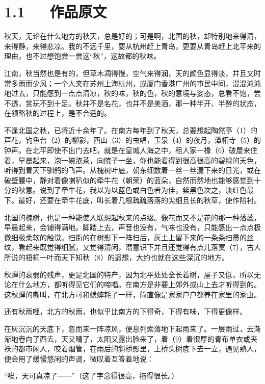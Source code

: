 \documentclass[letterpaper,12pt,english]{sphinxmanual}
\begin{document}
\section{1.1   作品原文}
\label{\detokenize{p01_u6563_u6587/_u90c1_u8fbe_u592b-_u53e4_u90fd_u7684_u79cb:id3}}
秋天，无论在什么地方的秋天，总是好的；可是啊，北国的秋，却特别地来得清，来得静，来得悲凉。我的不远千里，要从杭州赶上青岛，更要从青岛赶上北平来的理由，也不过想饱尝一尝这“秋”，这故都的秋味。

江南，秋当然也是有的，但草木凋得慢，空气来得润，天的颜色显得淡，并且又时常多雨而少风；一个人夹在苏州上海杭州，或厦门香港广州的市民中间，混混沌沌地过去，只能感到一点点清凉，秋的味，秋的色，秋的意境与姿态，总看不饱，尝不透，赏玩不到十足。秋并不是名花，也并不是美酒，那一种半开、半醉的状态，在领略秋的过程上，是不合适的。

不逢北国之秋，已将近十余年了。在南方每年到了秋天，总要想起陶然亭（1）的芦花，钓鱼台（2）的柳影，西山（3）的虫唱，玉泉（4）的夜月，潭柘寺（5）的钟声。在北平即使不出门去吧，就是在皇城人海之中，租人家一椽（6）破屋来住着，早晨起来，泡一碗浓茶，向院子一坐，你也能看得到很高很高的碧绿的天色，听得到青天下驯鸽的飞声。从槐树叶底，朝东细数着一丝一丝漏下来的日光，或在破壁腰中，静对着像喇叭似的牵牛花（朝荣）的蓝朵，自然而然地也能够感觉到十分的秋意。说到了牵牛花，我以为以蓝色或白色者为佳，紫黑色次之，淡红色最下。最好，还要在牵牛花底，叫长着几根疏疏落落的尖细且长的秋草，使作陪衬。

北国的槐树，也是一种能使人联想起秋来的点缀。像花而又不是花的那一种落蕊，早晨起来，会铺得满地。脚踏上去，声音也没有，气味也没有，只能感出一点点极微细极柔软的触觉。扫街的在树影下一阵扫后，灰土上留下来的一条条扫帚的丝纹，看起来既觉得细腻，又觉得清闲，潜意识下并且还觉得有点儿落寞（7），古人所说的梧桐一叶而天下知秋（8）的遥想，大约也就在这些深沉的地方。

秋蝉的衰弱的残声，更是北国的特产，因为北平处处全长着树，屋子又低，所以无论在什么地方，都听得见它们的啼唱。在南方是非要上郊外或山上去才听得到的。这秋蝉的嘶叫，在北方可和蟋蟀耗子一样，简直像是家家户户都养在家里的家虫。

还有秋雨哩，北方的秋雨，也似乎比南方的下得奇，下得有味，下得更像样。

在灰沉沉的天底下，忽而来一阵凉风，便息列索落地下起雨来了。一层雨过，云渐渐地卷向了西去，天又晴了，太阳又露出脸来了，着（9）着很厚的青布单衣或夹袄的都市闲人，咬着烟管，在雨后的斜桥影里，上桥头树底下去一立，遇见熟人，便会用了缓慢悠闲的声调，微叹着互答着地说：

“唉，天可真凉了——”（这了字念得很高，拖得很长。）
\end{document}
